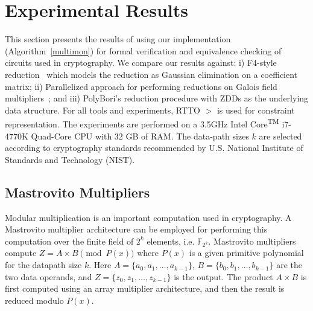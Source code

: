 \section{Experimental Results}
\label{sec:exp}

This section presents the results of using our implementation
(Algorithm~\ref{multimon}) for formal verification and equivalence
checking of circuits used in cryptography. We compare our results
against: i) F4-style reduction~\cite{pruss:tcad} which models the
reduction as Gaussian elimination on a coefficient matrix;   ii)
Parallelized approach for performing reductions on Galois field 
multipliers~\cite{cunxi:aspdac17};  and iii) PolyBori's \cite{polybori:2009}
reduction procedure with ZDDs as the
underlying data structure. For all tools and experiments, RTTO $>$ is
used for constraint representation. 
 The experiments are performed on a 3.5GHz
Intel Core\textsuperscript{TM} i7-4770K Quad-Core CPU with 32 GB of
RAM. 
The data-path sizes {$k$} are selected according to
cryptography standards recommended by U.S. National Institute of
Standards and Technology (NIST). 

\subsection{Mastrovito Multipliers}

Modular multiplication is an important computation used in
cryptography. A Mastrovito multiplier architecture can be employed for
performing this computation over the finite field of $2^k$ elements,
i.e. $\mathbb{F}_{2^k}$. Mastrovito multipliers compute $Z = A\times B \pmod{
  P(x)}$ where $P(x)$ is a given primitive polynomial for the datapath size
$k$. Here $A = \{a_0,a_1,\dots,a_{k-1}\}$, $B = \{b_0,b_1,\dots,b_{k-1}\}$ are the
two data operands, and
$Z = \{z_0,z_1,\dots,z_{k-1}\}$ is the output.
The product $A \times B$ is first computed using an array multiplier
architecture, and then the result is reduced modulo $P(x)$. 



